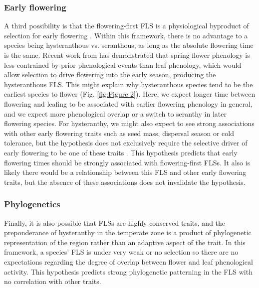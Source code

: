 \documentclass[12pt]{article}\usepackage[]{graphicx}\usepackage[]{color}
\begin{document}
\subsubsection*{Early flowering}
\indent\indent A third possibility is that the flowering-first FLS is a physiological byproduct of selection for early flowering \citep{Primack1987}. Within this framework, there is no advantage to a species being hysteranthous vs. seranthous, as long as the absolute flowering time is the same. Recent work from \citet{Savage2019} has demonstrated that spring flower phenology is less contrained by prior phenological events than leaf phenology, which would allow selection to drive flowering into the early season, producing the hysteranthous FLS. This might explain why hysteranthous species tend to be the earliest species to flower (Fig. \ref{fig:Figure 2}). Here, we expect longer time between flowering and leafing to be associated with earlier flowering phenology in general, and we expect more phenological overlap or a switch to seranthy in later flowering species. For hysteranthy, we might also expect to see strong associations with other early flowering traits such as seed mass, dispersal season or cold tolerance, but the hypothesis does not exclusively require the selective driver of early flowering to be one of these traits \citep{Savage2019}. This hypothesis predicts that early flowering times should be strongly associated with flowering-first FLSs. It also is likely there would be a relationship between this FLS and other early flowering traits, but the absence of these associations does not invalidate the hypothesis.

\subsubsection*{Phylogenetics} 
\indent\indent Finally, it is also possible that FLSs are highly conserved traits, and the preponderance of hysteranthy in the temperate zone is a product of phylogenetic representation of the region rather than an adaptive aspect of the trait. In this framework, a species' FLS is under very weak or no selection so there are no expectations regarding the degree of overlap between flower and leaf phenological activity.  This hypothesis predicts strong phylogenetic patterning in the FLS with no correlation with other traits.\\
\end{document}
